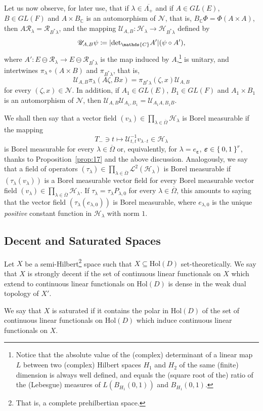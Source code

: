 \documentclass[10.5pt,reqno]{amsart}
\newcommand{\Hol}{\mathrm{Hol}}
\DeclarePairedDelimiter{\abs}{\lvert}{\rvert}
\newcommand{\C}{\mathds{C}}
\newcommand{\epsb}{\mathbold{\eps}}
\newcommand{\Hs}{\mathscr{H}}
\newcommand{\Us}{\mathscr{U}}
\newcommand{\Nc}{\mathcal{N}}
\newcommand{\Rc}{\mathcal{R}}
\newcommand{\eps}{\varepsilon}
\newcommand{\Lin}{\mathscr{L}}
\begin{document}
Let us now observe, for later use, that if $\lambda\in \overline{\Lambda_+}$ and if $A\in GL(E)$, $B\in GL(F)$ and $A\times B_\C$ is an automorphism of $\Nc$, that is, $B_\C \Phi=\Phi (A\times A)$, then $A\Rc_\lambda=\Rc_{ B^*\lambda}$, and the mapping $\Us_{A, B}\colon \Hs_\lambda\to \Hs_{ B^*\lambda}$ defined by
\[
\Us_{A,B} \psi\coloneqq \abs{{\det}_\C A'} (\psi\circ A'),
\]
where $A'\colon E\ominus \Rc_\lambda\to E\ominus \Rc_{B^*\lambda}$ is the map induced by $A$,\footnote{Notice that the absolute value of the (complex) determinant of a linear map $L$ between two (complex) Hilbert spaces $H_1$ and $H_2$ of the same (finite) dimension is always well defined, and equals the (square root of the) ratio of the (Lebesgue) measures of $L(B_{H_1}(0,1)) $ and $B_{H_1}(0,1)$.}
is unitary, and intertwines $\pi_\lambda \circ (A\times B)$ and $\pi_{ B^*\lambda}$, that is,
\[
\Us_{A,B}\pi_\lambda(A\zeta,B x)=\pi_{B^*\lambda} (\zeta,x)\Us_{A,B}
\]
for every $(\zeta,x)\in \Nc$. In addition, if $A_1\in GL(E)$, $B_1\in GL(F)$ and $A_1\times B_1$ is an automorphism of $\Nc$, then $\Us_{A,B}\Us_{A_1,B_1}=\Us_{A_1 A, B_1 B}$.

We shall then say that a vector field $(v_\lambda)\in \prod_{\lambda\in \overline \Omega} \Hs_\lambda$ is Borel measurable if the mapping 
\[
T_-\ni  t\mapsto \Us_{t, t}^{-1} v_{\lambda\cdot t}\in \Hs_{\lambda}
\]
is Borel measurable for every $\lambda\in \overline{\Omega}$ or, equivalently, for $\lambda=e_{\epsb}$, $\epsb\in \Set{0,1}^r$, thanks to Proposition~\ref{prop:17} and the above discussion. Analogously, we say that a field of operators $(\tau_\lambda)\in \prod_{\lambda\in \overline \Omega} \Lin^2(\Hs_\lambda)$ is Borel measurable if $(\tau_\lambda(v_\lambda))$ is a Borel measurable vector field for every Borel measurable vector field $(v_\lambda)\in\prod_{\lambda\in \overline \Omega} \Hs_\lambda $. If $\tau_\lambda=\tau_\lambda P_{\lambda,0}$ for every $\lambda\in \overline \Omega$, this amounts to saying that the vector field $(\tau_\lambda(e_{\lambda,0}))$ is Borel measurable, where $e_{\lambda,0}$ is the unique \emph{positive} constant function in $\Hs_\lambda$ with norm $1$.







\subsection{Decent and Saturated Spaces}

\begin{deff}\label{def:6}
	Let $X$ be a semi-Hilbert\footnote{That is, a complete prehilbertian space.}  space such that $X\subseteq \Hol(D)$ set-theoretically. 
	We say that $X$ is strongly decent if the set of continuous linear functionals on $X$ which extend to continuous linear functionals on $\Hol(D)$ is dense in the weak dual topology of $X'$.
	
	
	We say that $X$ is  saturated if it contains the polar in $\Hol(D)$ of the set of continuous linear functionals on $\Hol(D)$ which induce continuous linear functionals on $X$.
\end{deff}
\end{document}
